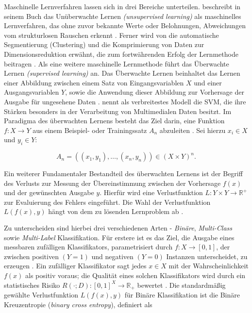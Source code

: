 Maschinelle Lernverfahren lassen sich in drei Bereiche unterteilen. \citeauthor{Sejnowski1999} beschreibt in seinem Buch  das Unüberwachte Lernen \emph{(unsupervised learning)} als maschinelles Lernverfahren, das ohne zuvor bekannte Werte oder Belohnungen, Abweichungen vom strukturlosen Rauschen erkennt \cite{Sejnowski1999}. Ferner wird von \citeauthor{duda1973pattern} die automatische Segmentierung (Clustering) und die Komprimierung von Daten zur Dimensionsreduktion erwähnt, die zum fortwährenden Erfolg der Lernmethode beitragen \cites[51\psq]{duda1973pattern}[51\psq]{Cord2008}. Als eine weitere maschinelle Lernmethode führt \citeauthor{Cord2008} das Überwachte Lernen \emph{(supervised learning)} an. Das Überwachte Lernen beinhaltet das Lernen einer Abbildung zwischen einem Satz von Eingangsvariablen $X$ und einer Ausgangsvariablen $Y$, sowie die Anwendung dieser Abbildung zur Vorhersage der Ausgabe für ungesehene Daten \cite[21\psqq]{Cord2008}. \citeauthor{Cord2008} nennt \citeyear{Cord2008} als verbreitestes Modell die \ac{SVM}, die ihre Stärken besonders in der Verarbeitung von Multimedialen Daten besitzt. Im Paradigma des überwachten Lernens besteht das Ziel darin, eine Funktion $f:X \longrightarrow Y$ aus einem Beispiel- oder Trainingssatz $A_{n}$ abzuleiten \cite[22]{Cord2008}. Sei hierzu $x_i \in X$ und $y_i \in Y$:

\begin{equation}
	A_{n} = ((x_{1},y_{1}),\dots,(x_{n},y_{n})) \in (X \times Y)^{n}.
\end{equation}

Ein weiterer Fundamentaler Bestandteil des überwachten Lernens ist der Begriff des Verlusts zur Messung der Übereinstimmung zwischen der Vorhersage $f(x)$ und der gewünschten Ausgabe $y$. Hierfür wird eine Verlustfunktion $L:Y \times Y \longrightarrow \mathbb{R}^+$ zur Evaluierung des Fehlers eingeführt. Die Wahl der Verlustfunktion $L(f(x),y)$ hängt von dem zu lösenden Lernproblem ab \cite[22]{Cord2008}. 

Zu unterscheiden sind hierbei drei verschiedenen Arten - \emph{Binäre}, \emph{Multi-Class} sowie \emph{Multi-Label} Klassifikation. Für erstere ist es das Ziel, die Ausgabe eines messbaren zufälligen Klassifikators, parametrisiert durch $f:X\rightarrow [0,1]$, der zwischen positiven $(Y=1)$ und negativen $(Y=0)$ Instanzen unterscheidet, zu erzeugen \cite[2\psq]{pmlr-v81-menon18a}. Ein zufälliger Klassifikator sagt jedes $x \in X$ mit der Wahrscheinlichkeit $f(x)$ als positiv voraus; die Qualität eines solchen Klassifikators wird durch ein statistisches Risiko $R(\cdot;D): [0,1]^X \rightarrow \mathbb{R}_{+} $ bewertet \cite[3]{pmlr-v81-menon18a}. Die standardmäßig gewählte Verlustfunktion $L(f(x),y)$ für Binäre Klassifikation ist die Binäre Kreuzentropie (\emph{binary cross entropy}), definiert als

